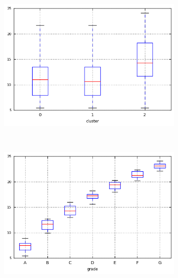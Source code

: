 \begin{anexosenv}
\begin{figure}[t!]
\begin{subfigure}[t]{0.45\textwidth}
            \centerline{\includegraphics[width=1.05\textwidth]{img/int_rate_float_by_cluster}}
        \end{subfigure}%
        ~ 
        \begin{subfigure}[t]{0.45\textwidth}
            \centering
   
            \centerline{\includegraphics[width=1.05\textwidth]{img/int_rate_float_by_grade}}

        \end{subfigure}
\end{figure}



\begin{figure}[t!]
    \centering
        \caption{\emph{Boxplots} de annual\textunderscore inc }
        \begin{subfigure}[t]{0.45\textwidth}
            \centering


\end{subfigure}
\end{figure}
\end{anexosenv}
